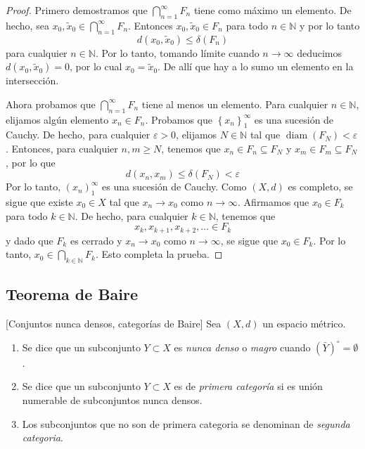 \begin{proof}  Primero demostramos que $\bigcap_{n=1}^{\infty} F_{n}$ tiene como máximo un elemento. De hecho, sea $x_{0}, \tilde{x}_{0} \in \bigcap_{n=1}^{\infty} F_{n}$. Entonces $x_{0}, \tilde{x}_{0} \in F_{n}$ para todo $n \in \mathbb{N}$ y por lo tanto
$$
d\left(x_{0}, \tilde{x}_{0}\right) \leq \delta\left(F_{n}\right)
$$
para cualquier $n \in \mathbb{N}$. Por lo tanto, tomando límite cuando $n\to\infty$ deducimos $d(x_0,\tilde{x}_0)=0$, por lo cual  $x_{0}=\tilde{x}_{0}$.  De allí que hay a lo sumo un elemento en la intersección.

Ahora probamos que $\bigcap_{n=1}^{\infty} F_{n}$ tiene al menos un elemento. Para cualquier $n \in \mathbb{N}$, elijamos algún elemento $x_{n} \in F_{n}$. Probamos que $\left\{x_{n}\right\}_{1}^{\infty}$ es una sucesión de Cauchy. De hecho, para cualquier $\varepsilon>0$, elijamos $N \in \mathbb{N}$ tal que $\operatorname{diam}\left(F_{N}\right)<\varepsilon$. Entonces, para cualquier $n, m \geq N$, tenemos que $x_{n} \in F_{n} \subseteq F_{N}$ y $x_{m} \in F_{m} \subseteq F_{ N}$, por lo que
$$
d\left(x_{n}, x_{m}\right) \leq \delta\left(F_{N}\right)<\varepsilon
$$
Por lo tanto, $\left(x_{n}\right)_{1}^{\infty}$ es una sucesión de Cauchy. Como $(X, d)$ es completo, se sigue que existe $x_{0} \in X$ tal que $x_{n} \longrightarrow x_{0}$ como $n \rightarrow \infty$. Afirmamos que $x_{0} \in F_{k}$ para todo $k \in \mathbb{N}$. De hecho, para cualquier $k \in \mathbb{N}$, tenemos que
$$
x_{k}, x_{k+1}, x_{k+2}, \ldots \in F_{k}
$$
y dado que $F_{k}$ es cerrado y $x_{n} \longrightarrow x_{0}$ como $n \rightarrow \infty$, se sigue que $x_{0} \in F_{k}$. Por lo tanto, $x_{0} \in \bigcap_{k \in \mathbb{N}} F_{k}$. Esto completa la prueba. 
\end{proof}










\subsection{Teorema de Baire}
\begin{definicion}{}[Conjuntos nunca densos, categorías de Baire] Sea $(X, d)$ un espacio métrico. 
\begin{enumerate}
 \item Se dice que un subconjunto $Y \subset X$ es \emph{nunca denso} o \emph{magro} cuando $(\bar{Y})^{\circ}=\emptyset$.
 \item Se dice que un subconjunto $Y \subset X$ es de \emph{ primera categoría}  si es  unión numerable de subconjuntos nunca densos.
 \item Los subconjuntos que no son de primera categoria se denominan de \emph{segunda categoria}.
\end{enumerate}
 
 

\end{definicion}

